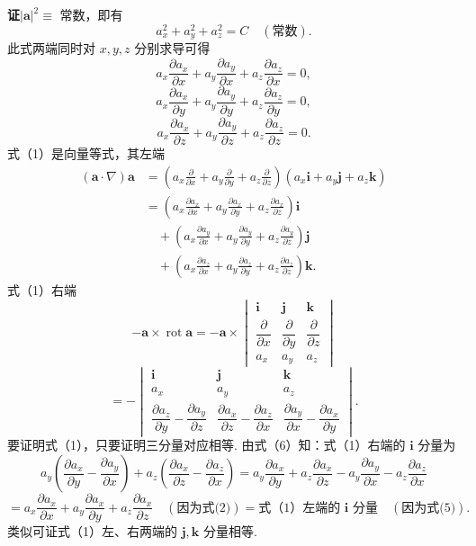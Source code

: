 \documentclass[UTF8,12pt,a4paper,fontset=fandol]{ctexart}
\begin{document}
\noindent\textbf{证}\quad $|\mathbf a|^2\equiv$ 常数，即有
\[
a_x^2+a_y^2+a_z^2=C\quad(\text{常数}).
\]
此式两端同时对 $x,y,z$ 分别求导可得
\[
a_x\frac{\partial a_x}{\partial x}+a_y\frac{\partial a_y}{\partial x}+a_z\frac{\partial a_z}{\partial x}=0, \tag{2}
\]
\[
a_x\frac{\partial a_x}{\partial y}+a_y\frac{\partial a_y}{\partial y}+a_z\frac{\partial a_z}{\partial y}=0, \tag{3}
\]
\[
a_x\frac{\partial a_x}{\partial z}+a_y\frac{\partial a_y}{\partial z}+a_z\frac{\partial a_z}{\partial z}=0. \tag{4}
\]
式（1）是向量等式，其左端
\[
\begin{aligned}
(\mathbf a\cdot\nabla)\mathbf a
&=\left(a_x\frac\partial{\partial x}+a_y\frac\partial{\partial y}+a_z\frac\partial{\partial z}\right)(a_x\mathbf i+a_y\mathbf j+a_z\mathbf k)\\
&=\left(a_x\frac{\partial a_x}{\partial x}+a_y\frac{\partial a_x}{\partial y}+a_z\frac{\partial a_x}{\partial z}\right)\mathbf i\\
&\quad+\left(a_x\frac{\partial a_y}{\partial x}+a_y\frac{\partial a_y}{\partial y}+a_z\frac{\partial a_y}{\partial z}\right)\mathbf j\\
&\quad+\left(a_x\frac{\partial a_z}{\partial x}+a_y\frac{\partial a_z}{\partial y}+a_z\frac{\partial a_z}{\partial z}\right)\mathbf k.
\end{aligned}
\tag{5}
\]
式（1）右端
\[
-\mathbf a\times\operatorname{rot}\mathbf a
=-\mathbf a\times
\begin{vmatrix}
\mathbf i & \mathbf j & \mathbf k\\
\dfrac{\partial}{\partial x} & \dfrac{\partial}{\partial y} & \dfrac{\partial}{\partial z}\\
a_x & a_y & a_z
\end{vmatrix}
\]
\[
=-
\begin{vmatrix}
\mathbf i & \mathbf j & \mathbf k\\
a_x & a_y & a_z\\
\dfrac{\partial a_z}{\partial y}-\dfrac{\partial a_y}{\partial z} &
\dfrac{\partial a_x}{\partial z}-\dfrac{\partial a_z}{\partial x} &
\dfrac{\partial a_y}{\partial x}-\dfrac{\partial a_x}{\partial y}
\end{vmatrix}. \tag{6}
\]
要证明式（1），只要证明三分量对应相等. 由式（6）知：式（1）右端的 $\mathbf i$ 分量为
\[
a_y\left(\frac{\partial a_x}{\partial y}-\frac{\partial a_y}{\partial x}\right)
+a_z\left(\frac{\partial a_x}{\partial z}-\frac{\partial a_z}{\partial x}\right)
=a_y\frac{\partial a_x}{\partial y}+a_z\frac{\partial a_x}{\partial z}
-a_y\frac{\partial a_y}{\partial x}-a_z\frac{\partial a_z}{\partial x}
\]
\[
=a_x\frac{\partial a_x}{\partial x}
+a_y\frac{\partial a_x}{\partial y}
+a_z\frac{\partial a_x}{\partial z}\quad(\text{因为式(2)})
=\text{式（1）左端的 $\mathbf i$ 分量}\quad(\text{因为式(5)}).
\]
类似可证式（1）左、右两端的 $\mathbf j,\mathbf k$ 分量相等.
\end{document}
